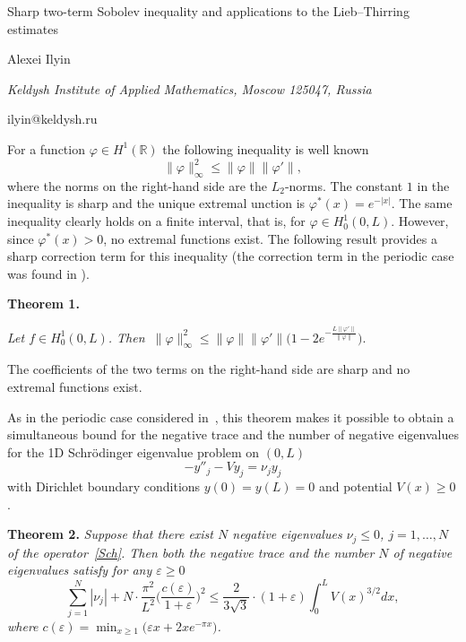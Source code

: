 \documentclass[10pt,a4paper]{article}
\begin{document}
\begin{center}

{\Large Sharp two-term Sobolev inequality and applications to the Lieb--Thirring estimates}

\bigskip

{\sc Alexei Ilyin}

{\small\it Keldysh Institute of Applied Mathematics, Moscow 125047, Russia}

{\small\rm ilyin@keldysh.ru}

\end{center}

\bigskip


For a function $\varphi\in H^1(\mathbb{R})$ the following inequality
is  well known
$$
\|\varphi\|_\infty^2\le \|\varphi\|\|\varphi'\|,
$$
where the norms on the right-hand side are the $L_2$-norms.
The constant $1$ in the  inequality is  sharp
and the unique extremal unction is
$
\varphi^*(x)=e^{-|x|}
$.
The same inequality clearly holds on a finite interval,
that is, for $\varphi\in H^1_0(0,L)$. However, since
$\varphi^*(x)>0$, no extremal functions exist.
The following result provides a sharp correction term
for this inequality (the correction term in the periodic case
was found in \cite{Zelik}).

\medskip
\noindent
{\bf Theorem 1.}
{\it Let $f\in H^1_0(0,L)$. Then
$
\ \|\varphi\|^2_\infty\le\|\varphi\|\|\varphi'\|\bigl(1-2e^{-\frac{L\|\varphi'\|}{\|\varphi\|}}\bigr).
$

\noindent
The  coefficients of the two terms on the right-hand side
are sharp and no extremal functions exist.}
\medskip



As in the periodic case considered in~\cite{JST}, this theorem makes
it possible to obtain a simultaneous bound for the negative
trace and the number of negative eigenvalues for the
1D Schr\"odinger eigenvalue problem on $(0,L)$
\begin{equation}
\label{Sch}
-y''_j-Vy_j=\nu_jy_j
\end{equation}
with Dirichlet boundary conditions $y(0)=y(L)=0$
and potential $V(x)\ge0$.

\medskip
\noindent
{\bf Theorem 2.}
{\it Suppose that there exist $N$ negative eigenvalues $\nu_j\le0$, %
$j=1,\dots,N$ of the operator~\eqref{Sch}. Then
both the negative trace and the number $N$ of negative
eigenvalues satisfy for any $\varepsilon\ge0$
$$
\sum_{j=1}^N|\nu_j|+N\cdot\frac{\pi^2}{L^2}
\biggl(\frac{c(\varepsilon)}{1+\varepsilon}\biggr)^{2}\le
\frac{2}{3\sqrt{3}}\cdot
(1+\varepsilon)\int_0^{L}V(x)^{3/2}dx,
$$
where
$
c(\varepsilon)=\min_{x\ge1}\bigl(\varepsilon x+2xe^{-\pi x}\bigr)
$.
}
\end{document}
